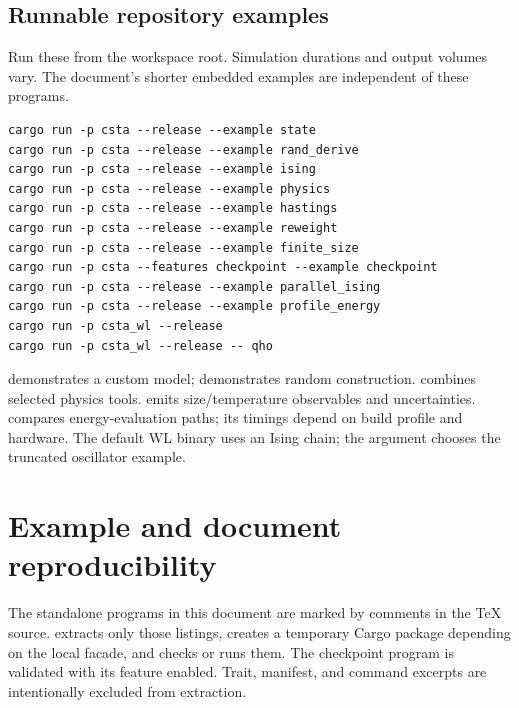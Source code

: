 \documentclass[11pt,a4paper,oneside]{report}
\newcommand{\api}[1]{\texttt{\detokenize{#1}}}
\begin{document}
\section{Runnable repository examples}
Run these from the workspace root. Simulation durations and output volumes vary.
The document's shorter embedded examples are independent of these programs.
\par\noindent\begin{minipage}{\linewidth}
\begin{lstlisting}[caption={Repository examples and demonstration binaries.}]
cargo run -p csta --release --example state
cargo run -p csta --release --example rand_derive
cargo run -p csta --release --example ising
cargo run -p csta --release --example physics
cargo run -p csta --release --example hastings
cargo run -p csta --release --example reweight
cargo run -p csta --release --example finite_size
cargo run -p csta --features checkpoint --example checkpoint
cargo run -p csta --release --example parallel_ising
cargo run -p csta --release --example profile_energy
cargo run -p csta_wl --release
cargo run -p csta_wl --release -- qho
\end{lstlisting}
\end{minipage}\par
{} demonstrates a custom model;  demonstrates
random construction.  combines selected physics tools.
 emits size/temperature observables and uncertainties.
 compares energy-evaluation paths; its timings depend on
build profile and hardware. The default WL binary uses an Ising chain; the
\api{qho} argument chooses the truncated oscillator example.

\chapter{Example and document reproducibility}
The standalone programs in this document are marked by \api{example:} comments
in the TeX source.  extracts only those listings,
creates a temporary Cargo package depending on the local facade, and checks or
runs them. The checkpoint program is validated with its feature enabled. Trait,
manifest, and command excerpts are intentionally excluded from extraction.
\end{document}
